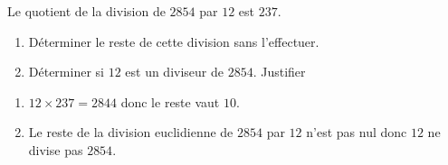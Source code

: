 \begin{exercice*}
    Le quotient de la division de $\num{2 854}$ par $12$ est $237$.
    \begin{enumerate}
        \item Déterminer le reste de cette division sans l'effectuer.
        \item Déterminer si $12$ est un diviseur de $\num{2854}$. Justifier
    \end{enumerate}
\end{exercice*}
\begin{corrige}
    \begin{enumerate}
        \item $12\times 237 = \num{2844}$ donc le reste vaut $10$.
        \item Le reste de la division euclidienne de $\num{2 854}$ par $12$ n'est pas nul donc $12$ ne divise pas $\num{2 854}$.
    \end{enumerate}
\end{corrige}

